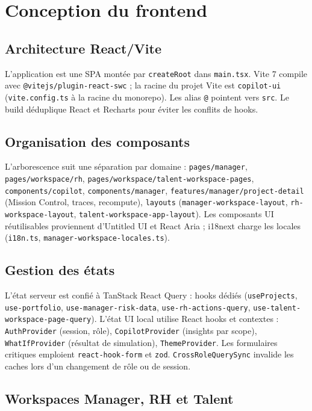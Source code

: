\section{Conception du frontend}

\subsection{Architecture React/Vite}

L'application est une SPA montée par \texttt{createRoot} dans \texttt{main.tsx}. Vite 7 compile avec \texttt{@vitejs/plugin-react-swc} ; la racine du projet Vite est \texttt{copilot-ui} (\texttt{vite.config.ts} à la racine du monorepo). Les alias \texttt{@} pointent vers \texttt{src}. Le build déduplique React et Recharts pour éviter les conflits de hooks.

\subsection{Organisation des composants}

L'arborescence suit une séparation par domaine : \texttt{pages/manager}, \texttt{pages/workspace/rh}, \texttt{pages/workspace/talent-workspace-pages}, \texttt{components/copilot}, \texttt{components/manager}, \texttt{features/manager/project-detail} (Mission Control, traces, recompute), \texttt{layouts} (\texttt{manager-workspace-layout}, \texttt{rh-workspace-layout}, \texttt{talent-workspace-app-layout}). Les composants UI réutilisables proviennent d'Untitled UI et React Aria ; i18next charge les locales (\texttt{i18n.ts}, \texttt{manager-workspace-locales.ts}).

\subsection{Gestion des états}

L'état serveur est confié à TanStack React Query : hooks dédiés (\texttt{useProjects}, \texttt{use-portfolio}, \texttt{use-manager-risk-data}, \texttt{use-rh-actions-query}, \texttt{use-talent-workspace-page-query}). L'état UI local utilise React hooks et contextes : \texttt{AuthProvider} (session, rôle), \texttt{CopilotProvider} (insights par scope), \texttt{WhatIfProvider} (résultat de simulation), \texttt{ThemeProvider}. Les formulaires critiques emploient \texttt{react-hook-form} et \texttt{zod}. \texttt{CrossRoleQuerySync} invalide les caches lors d'un changement de rôle ou de session.

\subsection{Workspaces Manager, RH et Talent}

